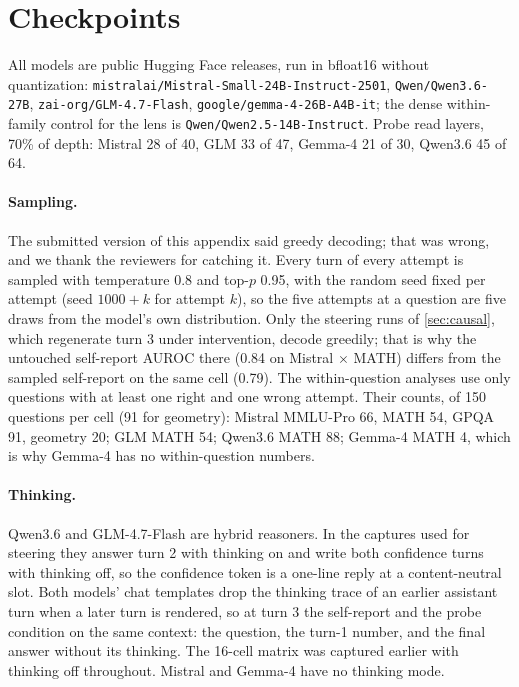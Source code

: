 \section{Checkpoints}
\label{app:checkpoints}
All models are public Hugging Face releases, run in bfloat16 without quantization:
\texttt{mistralai/Mistral-Small-24B-Instruct-2501},
\texttt{Qwen/Qwen3.6-27B},
\texttt{zai-org/GLM-4.7-Flash},
\texttt{google/gemma-4-26B-A4B-it};
the dense within-family control for the lens is \texttt{Qwen/Qwen2.5-14B-Instruct}.
Probe read layers, 70\% of depth: Mistral 28 of 40, GLM 33 of 47, Gemma-4 21 of 30, Qwen3.6 45 of 64.

\paragraph{Sampling.} The submitted version of this appendix said greedy decoding; that was wrong, and we thank the reviewers for catching it. Every turn of every attempt is sampled with temperature 0.8 and top-$p$ 0.95, with the random seed fixed per attempt (seed $1000+k$ for attempt $k$), so the five attempts at a question are five draws from the model's own distribution. Only the steering runs of \cref{sec:causal}, which regenerate turn 3 under intervention, decode greedily; that is why the untouched self-report AUROC there (0.84 on Mistral $\times$ MATH) differs from the sampled self-report on the same cell (0.79). The within-question analyses use only questions with at least one right and one wrong attempt. Their counts, of 150 questions per cell (91 for geometry): Mistral MMLU-Pro 66, MATH 54, GPQA 91, geometry 20; GLM MATH 54; Qwen3.6 MATH 88; Gemma-4 MATH 4, which is why Gemma-4 has no within-question numbers.

\paragraph{Thinking.} Qwen3.6 and GLM-4.7-Flash are hybrid reasoners. In the captures used for steering they answer turn 2 with thinking on and write both confidence turns with thinking off, so the confidence token is a one-line reply at a content-neutral slot. Both models' chat templates drop the thinking trace of an earlier assistant turn when a later turn is rendered, so at turn 3 the self-report and the probe condition on the same context: the question, the turn-1 number, and the final answer without its thinking. The 16-cell matrix was captured earlier with thinking off throughout. Mistral and Gemma-4 have no thinking mode.

